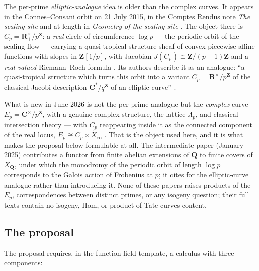 \documentclass[11pt]{article}
\theoremstyle{definition}
\theoremstyle{remark}
\newcommand{\Z}{\mathbf{Z}}
\newcommand{\Q}{\mathbf{Q}}
\newcommand{\R}{\mathbf{R}}
\newcommand{\C}{\mathbf{C}}
\newcommand{\Hom}{\mathrm{Hom}}
\begin{document}
The per-prime \emph{elliptic-analogue} idea is older than the complex curves.
It appears in the Connes--Consani orbit on 21 July 2015, in the Comptes
Rendus note \emph{The scaling site} \cite{CC16b} and at length in
\emph{Geometry of the scaling site} \cite{CC17}. The object there is
$C_p = \R^\times_+/p^{\Z}$: a \emph{real} circle of circumference $\log p$ ---
the periodic orbit of the scaling flow --- carrying a quasi-tropical structure
sheaf of convex piecewise-affine functions with slopes in $\Z[1/p]$, with
Jacobian $J(C_p) \cong \Z/(p-1)\Z$ and a \emph{real-valued} Riemann--Roch
formula \cite[Lemma~6.3, Thm.~6.5, Thm.~6.7(ii)]{CC16b}. Its authors describe
it as an analogue: ``a quasi-tropical structure which turns this orbit into a
variant $C_p = \R^\times_+/p^{\Z}$ of the classical Jacobi description
$\C^*/q^{\Z}$ of an elliptic curve'' \cite[abstract]{CC17}.

What is new in June 2026 is not the per-prime analogue but the \emph{complex}
curve $E_p = \C^\times/p^{\Z}$, with a genuine complex structure, the lattice
$\Lambda_p$, and classical intersection theory --- with $C_p$ reappearing inside
it as the connected component of the real locus, $E_p \cong C_p \times
\widetilde{X}_\infty$ \cite{CC26}. That is the object used here, and it is what
makes the proposal below formulable at all. The intermediate paper \cite{CC25}
(January 2025) contributes a functor from finite abelian extensions of $\Q$ to
finite covers of $X_\Q$, under which the monodromy of the periodic orbit of
length $\log p$ corresponds to the Galois action of Frobenius at $p$; it cites
\cite{CC17} for the elliptic-curve analogue rather than introducing it. None of
these papers raises products of the $E_p$, correspondences between distinct
primes, or any isogeny question; their full texts contain no isogeny, $\Hom$,
or product-of-Tate-curves content.

\subsection{The proposal}
\label{sec:seed}

The proposal requires, in the function-field template, a calculus with three
components:
\end{document}
